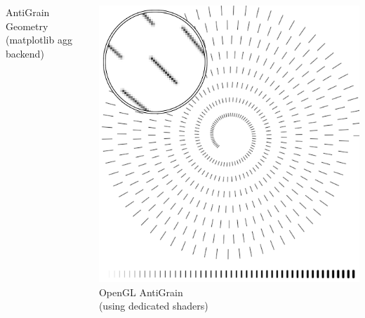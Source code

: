 \documentclass[10pt]{beamer}
\begin{document}
\begin{frame}
\begin{block}{}
\begin{columns}
\begin{column}{.225\textwidth}
\begin{center}
        \tiny AntiGrain Geometry\\(matplotlib agg backend)
        \end{center}
      \end{column}
      \begin{column}{.225\textwidth}
        \begin{center}
        \includegraphics[width=\textwidth]{gl-lines-detail}\\
        \tiny OpenGL AntiGrain\\(using dedicated shaders)
        \end{center}
      \end{column}
    \end{columns}
  \end{block}

\end{frame}
\end{document}
